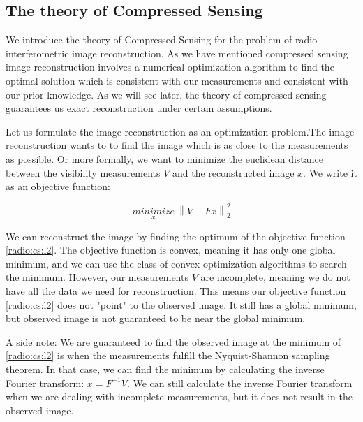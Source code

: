 
\subsection{The theory of Compressed Sensing}\label{radio:cs}
We introduce the theory of Compressed Sensing for the problem of radio interferometric image reconstruction. As we have mentioned compressed sensing image reconstruction involves a numerical optimization algorithm to find the optimal solution which is consistent with our measurements and consistent with our prior knowledge. As we will see later, the theory of compressed sensing guarantees us exact reconstruction under certain assumptions. 

Let us formulate the image reconstruction as an optimization problem.The image reconstruction wants to to find the image which is as close to the measurements as possible. Or more formally, we want to minimize the euclidean distance between the visibility measurements $V$ and the reconstructed image $x$. We write it as an objective function:

\begin{equation}\label{radio:cs:l2}
\underset{x}{minimize} \: \left \| V - Fx \right \|_2^2
\end{equation}

We can reconstruct the image by finding the optimum of the objective function \eqref{radio:cs:l2}. The objective function is convex, meaning it has only one global minimum, and we can use the class of convex optimization algorithms to search the minimum. However, our measurements $V$ are incomplete, meaning we do not have all the data we need for reconstruction. This means our objective function \eqref{radio:cs:l2} does not "point" to the observed image. It still has a global minimum, but observed image is not guaranteed to be near the global minimum.

A side note: We are guaranteed to find the observed image at the minimum of \eqref{radio:cs:l2} is when the measurements fulfill the Nyquist-Shannon sampling theorem. In that case, we can find the minimum by calculating the inverse Fourier transform: $x = F^{-1}V$. We can still calculate the inverse Fourier transform when we are dealing with incomplete measurements, but it does not result in the observed image.

